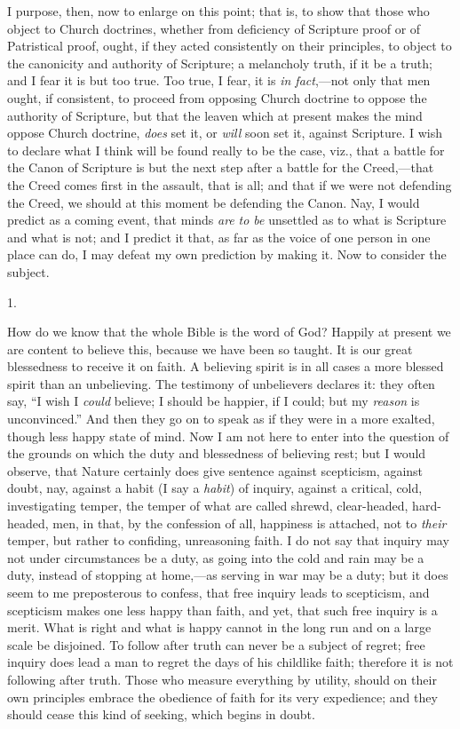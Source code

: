 I purpose, then, now to enlarge on this point; that is, to show
that those who object to Church doctrines, whether from deficiency of
Scripture proof or of Patristical proof, ought, if they acted
consistently on their principles, to object to the canonicity and
authority of Scripture; a melancholy truth, if it be a truth; and I
fear it is but too true. Too true, I fear, it is \emph{in fact},—not
only that men ought, if consistent, to proceed from opposing Church
doctrine to oppose the authority of Scripture, but that the leaven
which at present makes the mind oppose Church doctrine, \emph{does}
set it, or \emph{will} soon set it, against Scripture. I wish to
declare what I think will be found really to be the case, viz., that a
battle for the Canon of Scripture is but the next step after a battle
for the Creed,—that the Creed comes first in the assault, that is
all; and that if we were not defending the Creed, we should at this
moment be defending the Canon. Nay, I would predict as a coming event,
that minds \emph{are} \emph{to be} unsettled as to what is
Scripture and what is not; and I predict it that, as far as the voice
of one person in one place can do, I may defeat my own prediction by
making it. Now to consider the subject.

1.

How do we know that the whole Bible is the word of God? Happily at
present we are content to believe this, because we have been so
taught. It is our great blessedness to receive it on faith. A
believing spirit is in all cases a more blessed spirit than an
unbelieving. The testimony of unbelievers declares it: they often say,
``I wish I \emph{could} believe; I should be happier, if I could;
but my \emph{reason} is unconvinced.'' And then they go on to
speak as if they were in a more exalted, though less happy state of
mind. Now I am not here to enter into the question of the grounds on
which the duty and blessedness of believing rest; but I would observe,
that Nature certainly does give sentence against scepticism, against
doubt, nay, against a habit (I say a \emph{habit}) of inquiry, against
a critical, cold, investigating temper, the temper of what are called
shrewd, clear-headed, hard-headed, men, in that, by the confession of
all, happiness is attached, not to \emph{their} temper, but rather to
confiding, unreasoning faith. I do not say that inquiry may not under
circumstances be a duty, as going into the cold and rain may be a
duty, instead of stopping at home,—as serving in war may be a duty;
but it does seem to me preposterous to confess, that free inquiry
leads to scepticism, and scepticism makes one less happy than faith,
and yet, that such free inquiry is a merit. What is right and what is
happy cannot in the long run and on a large scale be disjoined. To
follow after truth can never be a subject of regret; free inquiry does
lead a man to regret the days of his childlike faith; therefore
it is not following after truth. Those who measure everything by
utility, should on their own principles embrace the obedience of faith
for its very expedience; and they should cease this kind of seeking,
which begins in doubt.

